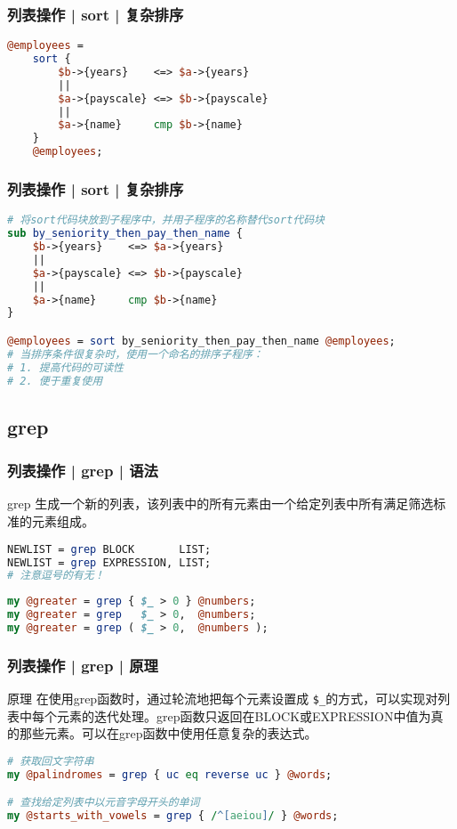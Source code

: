 \begin{frame}[fragile]
  \frametitle{列表操作 | sort | 复杂排序}
\begin{lstlisting}[language=Perl]
@employees = 
    sort {
        $b->{years}    <=> $a->{years}
        ||
        $a->{payscale} <=> $b->{payscale}
        ||
        $a->{name}     cmp $b->{name}
    }
    @employees;
\end{lstlisting}
\end{frame}

\begin{frame}[fragile]
  \frametitle{列表操作 | sort | 复杂排序}
\begin{lstlisting}[language=Perl]
# 将sort代码块放到子程序中，并用子程序的名称替代sort代码块
sub by_seniority_then_pay_then_name {
    $b->{years}    <=> $a->{years}
    ||
    $a->{payscale} <=> $b->{payscale}
    ||
    $a->{name}     cmp $b->{name}
}

@employees = sort by_seniority_then_pay_then_name @employees;
# 当排序条件很复杂时，使用一个命名的排序子程序：
# 1. 提高代码的可读性
# 2. 便于重复使用
\end{lstlisting}
\end{frame}

\subsection{grep}
\begin{frame}[fragile]
  \frametitle{列表操作 | grep | \alert{语法}}
  \begin{block}{grep}
    生成一个新的列表，该列表中的所有元素由一个给定列表中所有满足筛选标准的元素组成。 
  \end{block}
\begin{lstlisting}[language=Perl]
NEWLIST = grep BLOCK       LIST;
NEWLIST = grep EXPRESSION, LIST;
# 注意逗号的有无！
\end{lstlisting}
\pause
\begin{lstlisting}[language=Perl]
my @greater = grep { $_ > 0 } @numbers;
my @greater = grep   $_ > 0,  @numbers;
my @greater = grep ( $_ > 0,  @numbers );
\end{lstlisting}
\end{frame}

\begin{frame}[fragile]
  \frametitle{列表操作 | grep | 原理}
  \begin{block}{原理}
    在使用grep函数时，通过轮流地把每个元素设置成 \verb|$_|的方式，可以实现对列表中每个元素的迭代处理。grep函数只返回在BLOCK或EXPRESSION中值为真的那些元素。可以在grep函数中使用任意复杂的表达式。
  \end{block}
\begin{lstlisting}[language=Perl]
# 获取回文字符串
my @palindromes = grep { uc eq reverse uc } @words;

# 查找给定列表中以元音字母开头的单词
my @starts_with_vowels = grep { /^[aeiou]/ } @words;
\end{lstlisting}
\end{frame}

